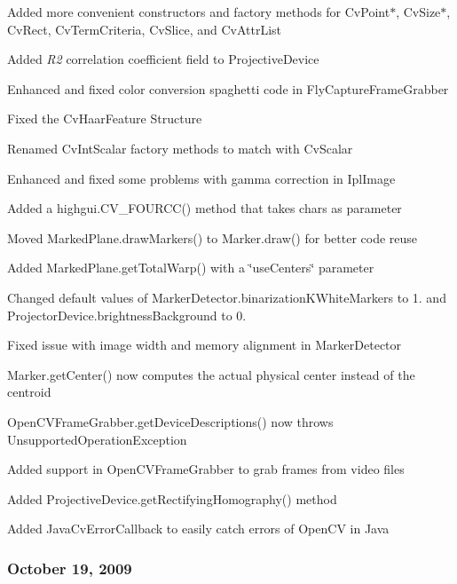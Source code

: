 \begin{DoxyItemize}
\item Added more convenient constructors and factory methods for {\ttfamily Cv\+Point$\ast$}, {\ttfamily Cv\+Size$\ast$}, {\ttfamily Cv\+Rect}, {\ttfamily Cv\+Term\+Criteria}, {\ttfamily Cv\+Slice}, and {\ttfamily Cv\+Attr\+List}
\item Added {\itshape R2} correlation coefficient field to {\ttfamily Projective\+Device}
\item Enhanced and fixed color conversion spaghetti code in {\ttfamily Fly\+Capture\+Frame\+Grabber}
\item Fixed the {\ttfamily Cv\+Haar\+Feature} Structure
\item Renamed {\ttfamily Cv\+Int\+Scalar} factory methods to match with {\ttfamily Cv\+Scalar}
\item Enhanced and fixed some problems with gamma correction in {\ttfamily Ipl\+Image}
\item Added a {\ttfamily highgui.\+C\+V\+\_\+\+F\+O\+U\+R\+C\+C()} method that takes chars as parameter
\item Moved {\ttfamily Marked\+Plane.\+draw\+Markers()} to {\ttfamily Marker.\+draw()} for better code reuse
\item Added {\ttfamily Marked\+Plane.\+get\+Total\+Warp()} with a \char`\"{}use\+Centers\char`\"{} parameter
\item Changed default values of {\ttfamily Marker\+Detector.\+binarization\+K\+White\+Markers} to 1. and {\ttfamily Projector\+Device.\+brightness\+Background} to 0.
\item Fixed issue with image width and memory alignment in {\ttfamily Marker\+Detector}
\item {\ttfamily Marker.\+get\+Center()} now computes the actual physical center instead of the centroid
\item {\ttfamily Open\+C\+V\+Frame\+Grabber.\+get\+Device\+Descriptions()} now throws {\ttfamily Unsupported\+Operation\+Exception}
\item Added support in {\ttfamily Open\+C\+V\+Frame\+Grabber} to grab frames from video files
\item Added {\ttfamily Projective\+Device.\+get\+Rectifying\+Homography()} method
\item Added {\ttfamily Java\+Cv\+Error\+Callback} to easily catch errors of Open\+C\+V in Java
\end{DoxyItemize}

\subsubsection*{October 19, 2009}


